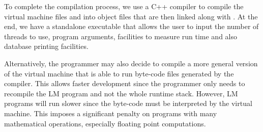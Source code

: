 To complete the compilation process, we use a C++ compiler to compile the
virtual machine files and  into object files that are then linked
along with . At the end, we have a standalone executable that
allows the user to input the number of threads to use, program arguments,
facilities to measure run time and also database printing facilities.

Alternatively, the programmer may also decide to compile a more general version
of the virtual machine that is able to run byte-code files generated by the
compiler. This allows faster development since the programmer only needs to
recompile the LM program and not the whole runtime stack. However, LM programs
will run slower since the byte-code must be interpreted by the virtual machine.
This imposes a significant penalty on programs with many mathematical
operations, especially floating point computations.
